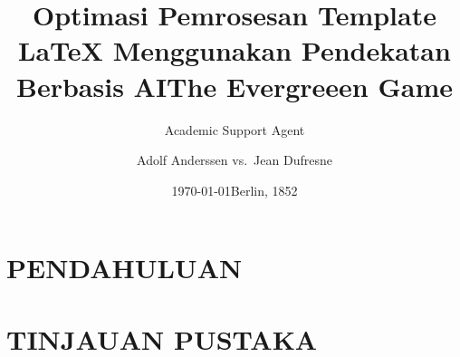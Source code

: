 \documentclass{article}
\title{Optimasi Pemrosesan Template LaTeX Menggunakan Pendekatan Berbasis AI}
\author{Academic Support Agent}
\date{\today}
\begin{document}
\maketitle

\begin{abstract}

\end{abstract}

\chapter{PENDAHULUAN}


\chapter{TINJAUAN PUSTAKA}


\usepackage[utf8]{inputenc}
\usepackage{paralist}
\usepackage{texmate}
    \renewcommand\iiopen{\unskip\ [}\renewcommand\iiclose{\unskip]\ }
    \renewcommand\iiiopen{\unskip\ (}\renewcommand\iiiclose{\unskip)\ }
    \VariationsEnvironment
        {\begin{compactitem}}
        {\end{compactitem}}
    
\title{The Evergreeen Game}

\author{Adolf Anderssen vs.\ Jean Dufresne}

\date{Berlin, 1852}
\end{document}
